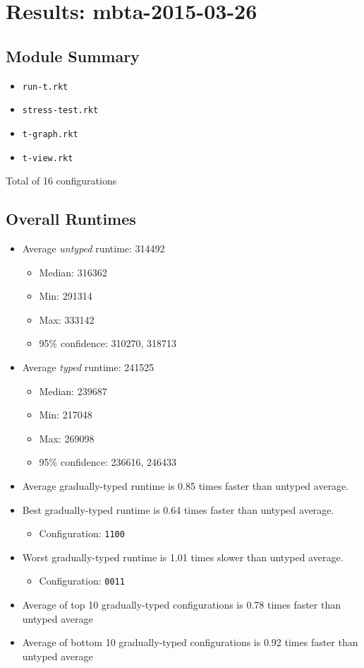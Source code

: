 \documentclass{article}
\newcommand{\mono}[1]{\texttt{#1}}
\begin{document}
\section{Results: mbta-2015-03-26}

\subsection{Module Summary}
\begin{itemize}
\item \mono{run-t.rkt}
\item \mono{stress-test.rkt}
\item \mono{t-graph.rkt}
\item \mono{t-view.rkt}\end{itemize}
Total of 16 configurations

\subsection{Overall Runtimes}
\begin{itemize}
\item Average \emph{untyped} runtime: 314492
  \begin{itemize}
  \item Median: 316362
  \item Min: 291314
  \item Max: 333142
  \item 95\% confidence: 310270, 318713
  \end{itemize}
\item Average \emph{typed} runtime: 241525
  \begin{itemize}
  \item Median: 239687
  \item Min: 217048
  \item Max: 269098
  \item 95\% confidence: 236616, 246433
  \end{itemize}
\item Average gradually-typed runtime is 0.85 times faster than untyped average.
\item Best gradually-typed runtime is 0.64 times faster than untyped average.
\begin{itemize}\item Configuration: \mono{1100}\end{itemize}
\item Worst gradually-typed runtime is 1.01 times slower than untyped average.
\begin{itemize}\item Configuration: \mono{0011}\end{itemize}
\item Average of top 10 gradually-typed configurations is 0.78 times faster than untyped average
\item Average of bottom 10 gradually-typed configurations is 0.92 times faster than untyped average
\end{itemize}
\end{document}
